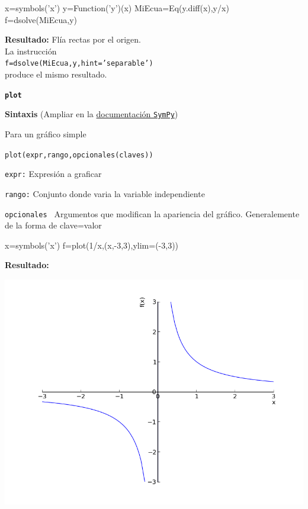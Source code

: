 \begin{pyverbatim}
x=symbols('x')
y=Function('y')(x)
MiEcua=Eq(y.diff(x),y/x)
f=dsolve(MiEcua,y)
\end{pyverbatim}

\noindent\textbf{Resultado:}
Flía rectas  por el origen. \\
La instrucción\\
\texttt{f=dsolve(MiEcua,y,hint='separable')}
\\produce el mismo resultado.





\begin{mdframed}[style=MiEstilo]\relax%
\textbf{\texttt{plot}}

\textbf{Sintaxis} (Ampliar en la \href{http://docs.sympy.org/latest/modules/plotting.html}{documentación \texttt{SymPy}})

Para un gráfico simple

\texttt{plot(expr,rango,opcionales(claves))}

\texttt{expr:} Expresión a graficar 

\texttt{rango:} Conjunto donde varia la variable independiente 

\texttt{opcionales } Argumentos que modifican la apariencia del gráfico. Generalemente de la forma de clave=valor

 
\end{mdframed}

\begin{ejemplo}{}

\end{ejemplo}


\begin{pyverbatim}
x=symbols('x')
f=plot(1/x,(x,-3,3),ylim=(-3,3))
\end{pyverbatim}

\noindent\textbf{Resultado:}
\begin{center}
\includegraphics[scale=.35]{imagenes/ejemplo_plot.png}
\end{center}












